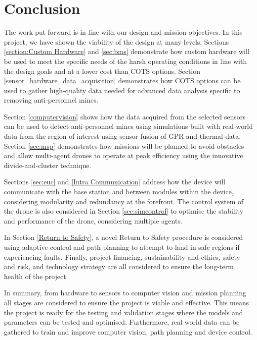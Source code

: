 \newpage
{}

\section{Conclusion} \label{conclusion}

The work put forward is in line with our design and mission objectives. In this project, we have shown the viability of the design at many levels. Sections \ref{section:Custom Hardware} and \ref{sec:bms} demonstrate how custom hardware will be used to meet the specific needs of the harsh operating conditions in line with the design goals and at a lower cost than \gls{COTS} options. Section \ref{sensor_hardware_data_acquisition} demonstrates how \gls{COTS} options can be used to gather high-quality data needed for advanced data analysis specific to removing anti-personnel mines.

Section \ref{computervision} shows how the data acquired from the selected sensors can be used to detect anti-personnel mines using simulations built with real-world data from the region of interest using sensor fusion of \gls{GPR} and thermal data. Section \ref{sec:msp} demonstrates how missions will be planned to avoid obstacles and allow multi-agent drones to operate at peak efficiency using the innovative divide-and-cluster technique. 

Sections \ref{sec:euc} and \ref{Intra Communication} address how the device will communicate with the base station and between modules within the device, considering modularity and redundancy at the forefront. The control system of the drone is also considered in Section \ref{sec:simcontrol} to optimise the stability and performance of the drone, considering multiple agents. 

In Section \ref{Return to Safety}, a novel Return to Safety procedure is considered using adaptive control and path planning to attempt to land in safe regions if experiencing faults. Finally, project financing, sustainability and ethics, safety and risk, and technology strategy are all considered to ensure the long-term health of the project. 

In summary, from hardware to sensors to computer vision and mission planning all stages are considered to ensure the project is viable and effective. This means the project is ready for the testing and validation stages where the models and parameters can be tested and optimised. Furthermore, real world data can be gathered to train and improve computer vision, path planning and device control.